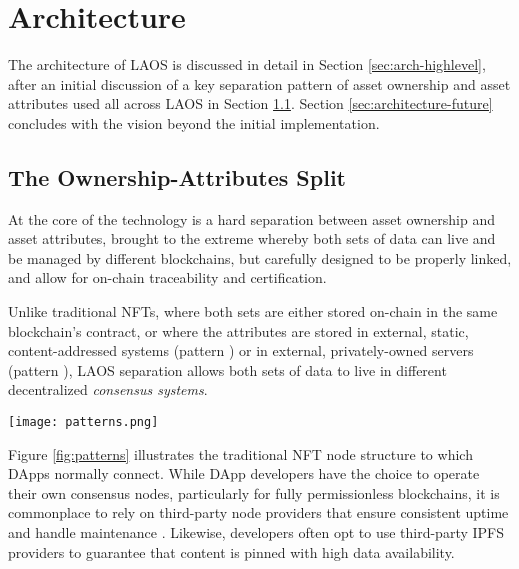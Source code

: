 \section{Architecture}\label{sec:architecture}

The architecture of LAOS is discussed in detail in
Section \ref{sec:arch-highlevel}, after an initial
discussion of a key separation pattern of asset ownership 
and asset attributes used all across LAOS in Section \ref{sec:separation}.
Section \ref{sec:architecture-future}
concludes with the vision beyond the initial implementation.


\subsection{The Ownership-Attributes Split}\label{sec:separation}

At the core of the technology is a hard separation
between asset ownership and asset attributes, brought to the extreme
whereby both sets of data can live and be managed by different blockchains,
but carefully designed to be properly linked, 
and allow for on-chain traceability and certification.

Unlike traditional NFTs, where both sets are either stored on-chain
in the same blockchain's contract, or where the attributes are stored
in external, static, content-addressed systems (pattern )
or in external, privately-owned servers (pattern ),
LAOS separation allows both sets of data to live in different decentralized {\it 
consensus systems}.

\begin{Figure}
    \medskip
    \texttt{[image: patterns.png]}
    \medskip
    \label{fig:patterns}
\end{Figure}

Figure \ref{fig:patterns} illustrates the traditional NFT node structure to which
DApps normally connect. While DApp developers
have the choice to operate their own consensus nodes,
particularly for fully permissionless blockchains,
it is commonplace to rely on third-party node providers that
ensure consistent uptime and handle maintenance \cite{stogerdemystifying}.
Likewise, developers often opt to use third-party IPFS providers to guarantee 
that content is pinned with high data availability.

